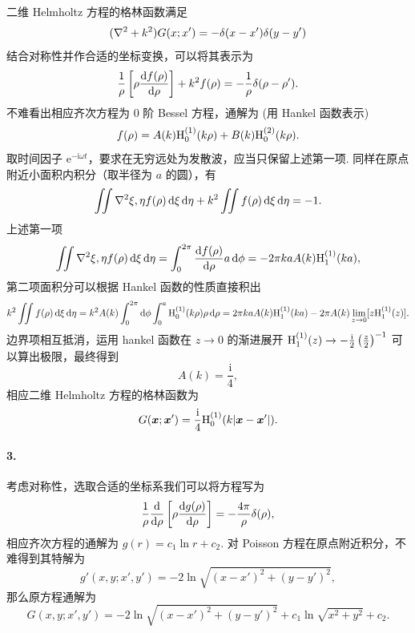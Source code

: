 \documentclass[12pt]{article}
\begin{document}
二维 Helmholtz 方程的格林函数满足
\begin{equation*}
	(\laplacian + k^2)G(x; x') = -\delta(x - x') \delta(y - y')
\end{equation*}
结合对称性并作合适的坐标变换，可以将其表示为
\begin{equation*}
	\frac{1}{\rho} \left[\rho \dv{f(\rho)}{\rho}\right] + k^2 f(\rho) = -\frac{1}{\rho} \delta(\rho - \rho').
\end{equation*}
不难看出相应齐次方程为 0 阶 Bessel 方程，通解为 (用 Hankel 函数表示)
\begin{equation*}
	f(\rho) = A(k) \textrm{H}^{(1)}_{0}(k\rho) + B(k) \textrm{H}^{(2)}_{0}(k\rho).
\end{equation*}
取时间因子 $\mathrm{e}^{-\mathrm{i} \omega t}$，要求在无穷远处为发散波，应当只保留上述第一项.
同样在原点附近小面积内积分（取半径为 $a$ 的圆），有
\begin{equation*}
	\iint \laplacian{\xi, \eta} f(\rho) \dd{\xi} \dd{\eta} + k^2 \iint f(\rho) \dd{\xi} \dd{\eta} = -1.
\end{equation*}
上述第一项
\begin{equation*}
	\iint \laplacian{\xi, \eta} f(\rho) \dd{\xi} \dd{\eta} = \int_{0}^{2\pi} \dv{f(\rho)}{\rho} a\dd{\phi} = -2\pi ka A(k) \hankel{1}{1}(ka),
\end{equation*}
第二项面积分可以根据 Hankel 函数的性质直接积出
\begin{equation*}
	k^2 \iint f(\rho) \dd{\xi} \dd{\eta} = k^2 A(k) \int_{0}^{2\pi} \dd{\phi} \int_{0}^{a} \textrm{H}^{(1)}_{0}(k\rho) \rho \dd{\rho} = 2\pi ka A(k) \textrm{H}^{(1)}_{1}(ka) - 2\pi A(k) \lim_{z \to 0}[z\textrm{H}^{(1)}_{1}(z)].
\end{equation*}
边界项相互抵消，运用 hankel 函数在 $z \to 0$ 的渐进展开 $\textrm{H}^{(1)}_{1}(z) \to -\frac{\mathrm{i}}{2} \left(\frac{z}{2}\right)^{-1}$ 可以算出极限，最终得到
\begin{equation*}
	A(k) = \frac{\mathrm{i}}{4},
\end{equation*}
相应二维 Helmholtz 方程的格林函数为
\begin{equation*}
	G(\vb*{x}; \vb*{x}') = \frac{\mathrm{i}}{4} \textrm{H}^{(1)}_{0}(k\abs{\vb*{x} - \vb*{x}'}).
\end{equation*}

\paragraph{3.}
考虑对称性，选取合适的坐标系我们可以将方程写为
\begin{equation*}
	\frac{1}{\rho} \dv{\rho}\left[\rho \dv{g(\rho)}{\rho}\right] = -\frac{4\pi}{\rho} \delta(\rho),
\end{equation*}
相应齐次方程的通解为 $g(r) = c_1 \ln r + c_2$.
对 Poisson 方程在原点附近积分，不难得到其特解为
\begin{equation*}
	g'(x, y; x', y') = -2\ln\sqrt{(x - x')^2 + (y - y')^2},
\end{equation*}
那么原方程通解为
\begin{equation*}
	G(x, y; x', y') = -2\ln\sqrt{(x - x')^2 + (y - y')^2} + c_1 \ln\sqrt{x^2 + y^2} + c_2.
\end{equation*}
\end{document}
